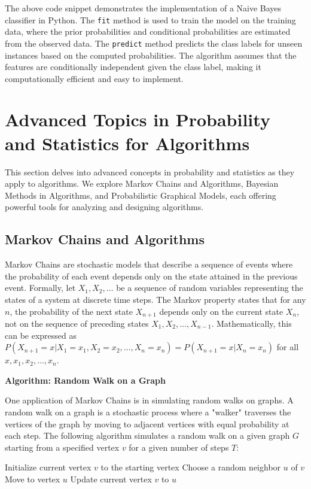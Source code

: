 \documentclass[12pt]{book} %
\begin{document}
The above code snippet demonstrates the implementation of a Naive Bayes classifier in Python. The \texttt{fit} method is used to train the model on the training data, where the prior probabilities and conditional probabilities are estimated from the observed data. The \texttt{predict} method predicts the class labels for unseen instances based on the computed probabilities. The algorithm assumes that the features are conditionally independent given the class label, making it computationally efficient and easy to implement.


\section{Advanced Topics in Probability and Statistics for Algorithms}
This section delves into advanced concepts in probability and statistics as they apply to algorithms. We explore Markov Chains and Algorithms, Bayesian Methods in Algorithms, and Probabilistic Graphical Models, each offering powerful tools for analyzing and designing algorithms.

\subsection{Markov Chains and Algorithms}
Markov Chains are stochastic models that describe a sequence of events where the probability of each event depends only on the state attained in the previous event. Formally, let \(X_1, X_2, \ldots\) be a sequence of random variables representing the states of a system at discrete time steps. The Markov property states that for any \(n\), the probability of the next state \(X_{n+1}\) depends only on the current state \(X_n\), not on the sequence of preceding states \(X_1, X_2, \ldots, X_{n-1}\). Mathematically, this can be expressed as \(P(X_{n+1} = x | X_1 = x_1, X_2 = x_2, \ldots, X_n = x_n) = P(X_{n+1} = x | X_n = x_n)\) for all \(x, x_1, x_2, \ldots, x_n\).

\textbf{Algorithm: Random Walk on a Graph}

One application of Markov Chains is in simulating random walks on graphs. A random walk on a graph is a stochastic process where a "walker" traverses the vertices of the graph by moving to adjacent vertices with equal probability at each step. The following algorithm simulates a random walk on a given graph \(G\) starting from a specified vertex \(v\) for a given number of steps \(T\):
\FloatBarrier
\begin{algorithm}[H]
\caption{Random Walk on a Graph}
\begin{algorithmic}[1]
\State Initialize current vertex $v$ to the starting vertex
    \State Choose a random neighbor $u$ of $v$
    \State Move to vertex $u$
    \State Update current vertex $v$ to $u$
\EndFor
\end{algorithmic}
\end{algorithm}
\end{document}
